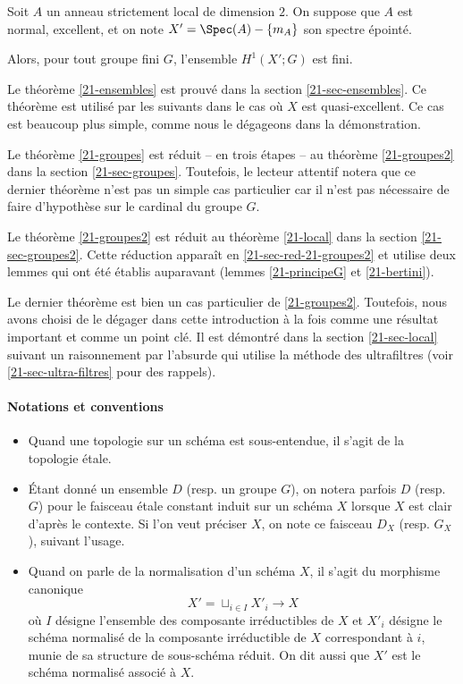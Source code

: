 \documentclass[10pt]{../fichiers-configuration-latex/smfart}
\begin{document}
\begin{theoreme}[Gabber] \label{21-local}
Soit $A$ un anneau strictement local de dimension $2$.
On suppose que $A$ est normal, excellent, et on note $X'=\Spec(A)-\{\mathfrak{m}_A\}$
 son spectre épointé.

Alors, pour tout groupe fini $G$,
 l'ensemble $H^1(X';G)$ est fini.
\end{theoreme}

Le théorème \ref{21-ensembles} est prouvé dans la section \ref{21-sec-ensembles}.
Ce théorème est utilisé par les suivants dans le cas où $X$ est quasi-excellent.
Ce cas est beaucoup plus simple, comme nous le dégageons dans la démonstration.

Le théorème \ref{21-groupes} est réduit -- en trois étapes --
 au théorème \ref{21-groupes2} dans la section \ref{21-sec-groupes}.
Toutefois, le lecteur attentif notera que ce dernier théorème 
 n'est pas un simple cas particulier car il n'est pas nécessaire
 de faire d'hypothèse sur le cardinal du groupe $G$.

Le théorème \ref{21-groupes2} est réduit au théorème \ref{21-local}
 dans la section \ref{21-sec-groupes2}.
Cette réduction apparaît en \ref{21-sec-red-21-groupes2}
 et utilise deux lemmes qui ont été établis auparavant 
 (lemmes \ref{21-principeG} et \ref{21-bertini}).

Le dernier théorème est bien un cas particulier de \ref{21-groupes2}.
Toutefois, nous avons choisi de le dégager dans cette introduction
 à la fois comme une résultat important
  et comme un point clé.
Il est démontré dans la section \ref{21-sec-local}
 suivant un raisonnement par l'absurde qui utilise
 la méthode des ultrafiltres (voir \ref{21-sec-ultra-filtres} pour des rappels).

\paragraph*{Notations et conventions}
\begin{itemize}
\item Quand une topologie
 sur un schéma est sous-entendue, il s'agit de la topologie étale.
\item
Étant donné un ensemble $D$ (resp. un groupe $G$), on notera parfois $D$ (resp. $G$)
 pour le faisceau étale constant induit sur un schéma $X$ lorsque $X$ est clair
 d'après le contexte. Si l'on veut préciser $X$,
 on note ce faisceau $D_X$ (resp. $G_X$), suivant l'usage.
\item
Quand on parle de la normalisation d'un schéma $X$,
 il s'agit du morphisme canonique
$$
X'=\sqcup_{i \in I} X'_i \rightarrow X
$$
où $I$ désigne l'ensemble des composante irréductibles de $X$
 et $X'_i$ désigne le schéma normalisé de la composante irréductible de $X$ correspondant
 à $i$, munie de sa structure de sous-schéma réduit.
On dit aussi que $X'$ est le schéma normalisé associé à $X$.
\end{itemize}
\end{document}
